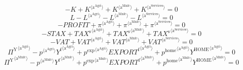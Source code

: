 \begin{equation}
-K + {K}^{\langle \mathrm{a}^{\mathrm{Agri}}\rangle} + {K}^{\langle \mathrm{a}^{\mathrm{Mnfc}}\rangle} + {K}^{\langle \mathrm{a}^{\mathrm{Services}}\rangle} = 0
\end{equation}
\begin{equation}
L - {L}^{\langle \mathrm{a}^{\mathrm{Agri}}\rangle} - {L}^{\langle \mathrm{a}^{\mathrm{Mnfc}}\rangle} - {L}^{\langle \mathrm{a}^{\mathrm{Services}}\rangle} = 0
\end{equation}
\begin{equation}
-{P\!R\!O\!F\!I\!T} + {\pi}^{\langle \mathrm{a}^{\mathrm{Agri}}\rangle} + {\pi}^{\langle \mathrm{a}^{\mathrm{Mnfc}}\rangle} + {\pi}^{\langle \mathrm{a}^{\mathrm{Services}}\rangle} = 0
\end{equation}
\begin{equation}
-{S\!T\!A\!X} + {{T\!A\!X}^{\mathrm{s}}}^{\langle \mathrm{a}^{\mathrm{Agri}}\rangle} + {{T\!A\!X}^{\mathrm{s}}}^{\langle \mathrm{a}^{\mathrm{Mnfc}}\rangle} + {{T\!A\!X}^{\mathrm{s}}}^{\langle \mathrm{a}^{\mathrm{Services}}\rangle} = 0
\end{equation}
\begin{equation}
-{V\!A\!T} + {{V\!A\!T}}^{\langle \mathrm{a}^{\mathrm{Agri}}\rangle} + {{V\!A\!T}}^{\langle \mathrm{a}^{\mathrm{Mnfc}}\rangle} + {{V\!A\!T}}^{\langle \mathrm{a}^{\mathrm{Services}}\rangle} = 0
\end{equation}
\begin{equation}
{\Pi^{\mathrm{Y}}}^{\langle \mathrm{a}^{\mathrm{Agri}}\rangle} - {{p}^{\langle \mathrm{a}^{\mathrm{Agri}}\rangle}} {{Y^{\mathrm{f}}}^{\langle \mathrm{a}^{\mathrm{Agri}}\rangle}} + {{p^{\mathrm{exp}}}^{\langle \mathrm{a}^{\mathrm{Agri}}\rangle}} {{{E\!X\!P\!O\!R\!T}^{\mathrm{f}}}^{\langle \mathrm{a}^{\mathrm{Agri}}\rangle}} + {{p^{\mathrm{home}}}^{\langle \mathrm{a}^{\mathrm{Agri}}\rangle}} {{Y^{\mathrm{HOME}}}^{\langle \mathrm{a}^{\mathrm{Agri}}\rangle}} = 0
\end{equation}
\begin{equation}
{\Pi^{\mathrm{Y}}}^{\langle \mathrm{a}^{\mathrm{Mnfc}}\rangle} - {{p}^{\langle \mathrm{a}^{\mathrm{Mnfc}}\rangle}} {{Y^{\mathrm{f}}}^{\langle \mathrm{a}^{\mathrm{Mnfc}}\rangle}} + {{p^{\mathrm{exp}}}^{\langle \mathrm{a}^{\mathrm{Mnfc}}\rangle}} {{{E\!X\!P\!O\!R\!T}^{\mathrm{f}}}^{\langle \mathrm{a}^{\mathrm{Mnfc}}\rangle}} + {{p^{\mathrm{home}}}^{\langle \mathrm{a}^{\mathrm{Mnfc}}\rangle}} {{Y^{\mathrm{HOME}}}^{\langle \mathrm{a}^{\mathrm{Mnfc}}\rangle}} = 0
\end{equation}
